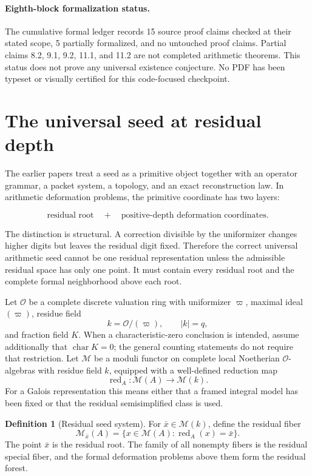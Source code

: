\documentclass[11pt]{article}
\theoremstyle{definition}
\newtheorem{definition}[theorem]{Definition}
\theoremstyle{remark}
\newcommand{\Ocal}{\mathcal O}
\newcommand{\red}{\operatorname{red}}
\begin{document}
\paragraph{Eighth-block formalization status.}
The cumulative formal ledger records 15 source proof claims checked at their
stated scope, 5 partially formalized, and no untouched proof claims. Partial
claims 8.2, 9.1, 9.2, 11.1, and 11.2 are not completed arithmetic theorems.
This status does not prove any universal existence conjecture. No PDF has been
typeset or visually certified for this code-focused checkpoint.

\tableofcontents
\newpage

\section{The universal seed at residual depth}

The earlier papers treat a seed as a primitive object together with an operator grammar, a packet system, a topology, and an exact reconstruction law.  In arithmetic deformation problems, the primitive coordinate has two layers:

\[
\boxed{
\text{residual root}
\quad+\quad
\text{positive-depth deformation coordinates}.
}
\]

The distinction is structural.  A correction divisible by the uniformizer changes higher digits but leaves the residual digit fixed.  Therefore the correct universal arithmetic seed cannot be one residual representation unless the admissible residual space has only one point.  It must contain every residual root and the complete formal neighborhood above each root.

Let \(\Ocal\) be a complete discrete valuation ring with uniformizer \(\varpi\), maximal ideal \((\varpi)\), residue field
\[
k=\Ocal/(\varpi),\qquad |k|=q,
\]
and fraction field \(K\).  When a characteristic-zero conclusion is intended, assume additionally that \(\operatorname{char}K=0\); the general counting statements do not require that restriction.  Let \(\mathcal M\) be a moduli functor on complete local Noetherian \(\Ocal\)-algebras with residue field \(k\), equipped with a well-defined reduction map
\[
\red_A:\mathcal M(A)\longrightarrow \mathcal M(k).
\]
For a Galois representation this means either that a framed integral model has been fixed or that the residual semisimplified class is used.

\begin{definition}[Residual seed system]
For \(\bar x\in\mathcal M(k)\), define the residual fiber
\[
\mathcal M_{\bar x}(A)
=
\{x\in\mathcal M(A):\red_A(x)=\bar x\}.
\]
The point \(\bar x\) is the residual root.  The family of all nonempty fibers is the residual special fiber, and the formal deformation problems above them form the residual forest.
\end{definition}
\end{document}
